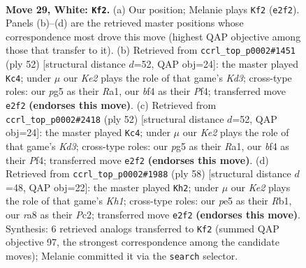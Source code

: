 \documentclass[11pt]{article}
\begin{document}
\clearpage

\begin{figure}[p]\centering
\begin{subfigure}{0.46\textwidth}\centering
\resizebox{\linewidth}{!}{%
\newchessgame
\chessboard[
  setfen={r1k3nN/3n4/8/pp2pbp1/5b1p/5P1P/P3K1P1/7R w - - 4 29},
  showmover=false,
  pgfstyle=straightmove, color=movearrow, markmove={e2-f2}
]}
\caption{}
\end{subfigure}\hfill
\begin{subfigure}{0.46\textwidth}\centering
\resizebox{\linewidth}{!}{%
\newchessgame
\chessboard[
  setfen={1k5r/pp3p1p/2p5/Pnb2N2/5P2/3KP3/5PBP/R7 w - - 5 27},
  showmover=false,
  pgfstyle=straightmove, color=movearrow, markmove={d3-c4}
]}
\caption{}
\end{subfigure}
\\[4pt]
\begin{subfigure}{0.46\textwidth}\centering
\resizebox{\linewidth}{!}{%
\newchessgame
\chessboard[
  setfen={1k5r/pp3p1p/2p5/Pnb2N2/5P2/3KP3/5PBP/R7 w - - 4 27},
  showmover=false,
  pgfstyle=straightmove, color=movearrow, markmove={d3-c4}
]}
\caption{}
\end{subfigure}\hfill
\begin{subfigure}{0.46\textwidth}\centering
\resizebox{\linewidth}{!}{%
\newchessgame
\chessboard[
  setfen={8/1r2pp1k/p6p/1p1N1Pb1/8/P6P/1PP3P1/1R5K w - - 1 30},
  showmover=false,
  pgfstyle=straightmove, color=movearrow, markmove={h1-h2}
]}
\caption{}
\end{subfigure}
\caption{\textbf{Move 29, White: \texttt{Kf2}.} (a) Our position; Melanie plays \texttt{Kf2} (\texttt{e2f2}). Panels (b)--(d) are the retrieved master positions whose correspondence most drove this move (highest QAP objective among those that transfer to it). (b) Retrieved from \texttt{ccrl\_top\_p0002\#1451} (ply 52) [structural distance $d$=52, QAP obj=24]: the master played \texttt{Kc4}; under $\mu$ our \emph{Ke2} plays the role of that game's \emph{Kd3}; cross-type roles: our \emph{p}g5 as their \emph{R}a1, our \emph{b}f4 as their \emph{P}f4; transferred move \texttt{e2f2} \textbf{(endorses this move)}. (c) Retrieved from \texttt{ccrl\_top\_p0002\#2418} (ply 52) [structural distance $d$=52, QAP obj=24]: the master played \texttt{Kc4}; under $\mu$ our \emph{Ke2} plays the role of that game's \emph{Kd3}; cross-type roles: our \emph{p}g5 as their \emph{R}a1, our \emph{b}f4 as their \emph{P}f4; transferred move \texttt{e2f2} \textbf{(endorses this move)}. (d) Retrieved from \texttt{ccrl\_top\_p0002\#1988} (ply 58) [structural distance $d$=48, QAP obj=22]: the master played \texttt{Kh2}; under $\mu$ our \emph{Ke2} plays the role of that game's \emph{Kh1}; cross-type roles: our \emph{p}e5 as their \emph{R}b1, our \emph{r}a8 as their \emph{P}c2; transferred move \texttt{e2f2} \textbf{(endorses this move)}. Synthesis: 6 retrieved analogs transferred to \texttt{Kf2} (summed QAP objective 97, the strongest correspondence among the candidate moves); Melanie committed it via the \texttt{search} selector.}
\label{fig:thought-m56}
\end{figure}
\end{document}

